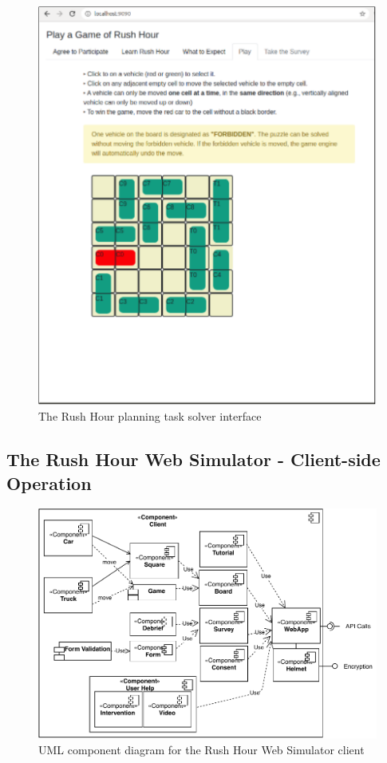 \begin{figure}[tpb]
  \centering
\includegraphics[width=\columnwidth]{img/UI3.pdf}
  \caption{The Rush Hour planning task solver interface}
  \label{fig:ui3}
\end{figure}

\subsection{The Rush Hour Web Simulator - Client-side Operation}
\begin{figure}[tpb]
  \centering
\includegraphics[width=\columnwidth]{img/componentclient.pdf}
  \caption{UML component diagram for the Rush Hour Web Simulator client}
  \label{fig:compclient}
\end{figure}

